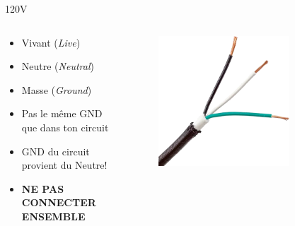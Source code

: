 \begin{frame}{120V}
    \begin{columns}
        \begin{column}{0.5\textwidth}
            \begin{itemize}
                \item<1-> Vivant (\textit{Live})
                \item<1-> Neutre (\textit{Neutral})
                \item<1-> Masse (\textit{Ground})
                \bigskip
                \item<2-> Pas le même GND que dans ton circuit
                \item<2-> GND du circuit provient du Neutre!
                \item<2-> \textbf{NE PAS CONNECTER ENSEMBLE}
            \end{itemize}
        \end{column}
        \begin{column}{0.5\textwidth}
            \begin{figure}
                \centering
                \includegraphics[width=0.75\textwidth]{pictures/120v-wire.png}
            \end{figure}
        \end{column}
    \end{columns}
\end{frame}

